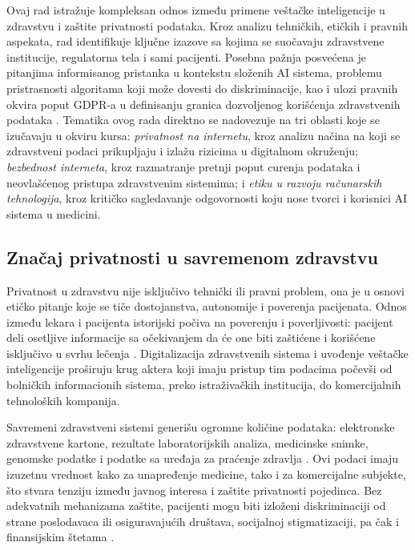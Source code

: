 \documentclass[12pt]{article}
\begin{document}
Ovaj rad istražuje kompleksan odnos između primene veštačke inteligencije u zdravstvu i zaštite privatnosti podataka. Kroz analizu tehničkih, etičkih i pravnih aspekata, rad identifikuje ključne izazove sa kojima se suočavaju zdravstvene institucije, regulatorna tela i sami pacijenti. Posebna pažnja posvećena je pitanjima informisanog pristanka u kontekstu složenih AI sistema, problemu pristrasnosti algoritama koji može dovesti do diskriminacije, kao i ulozi pravnih okvira poput GDPR-a u definisanju granica dozvoljenog korišćenja zdravstvenih podataka \cite{kumar2025}. Tematika ovog rada direktno se nadovezuje na tri oblasti koje se izučavaju u okviru kursa: \textit{privatnost na internetu}, kroz analizu načina na koji se zdravstveni podaci prikupljaju i izlažu rizicima u digitalnom okruženju; \textit{bezbednost interneta}, kroz razmatranje pretnji poput curenja podataka i neovlašćenog pristupa zdravstvenim sistemima; i \textit{etiku u razvoju računarskih tehnologija}, kroz kritičko 
sagledavanje odgovornosti koju nose tvorci i korisnici AI sistema u medicini.
 
\subsection{Značaj privatnosti u savremenom zdravstvu}
 
Privatnost u zdravstvu nije isključivo tehnički ili pravni problem, ona je u osnovi etičko pitanje koje se tiče dostojanstva, autonomije i poverenja pacijenata. Odnos između lekara i pacijenta istorijski počiva na poverenju i poverljivosti: pacijent deli osetljive informacije sa očekivanjem da će one biti zaštićene i korišćene isključivo u svrhu lečenja \cite{murdoch2021}. Digitalizacija zdravstvenih sistema i uvođenje veštačke inteligencije proširuju krug aktera koji imaju pristup tim podacima počevši od bolničkih informacionih sistema, preko istraživačkih institucija, do komercijalnih tehnoloških kompanija.
 
Savremeni zdravstveni sistemi generišu ogromne količine podataka: elektronske zdravstvene kartone, rezultate laboratorijskih analiza, medicinske snimke, genomske podatke i podatke sa uređaja za praćenje zdravlja \cite{abouelmehdi2017}. Ovi podaci imaju izuzetnu vrednost kako za unapređenje medicine, tako i za komercijalne subjekte, što stvara tenziju između javnog interesa i zaštite privatnosti pojedinca. Bez adekvatnih mehanizama zaštite, pacijenti mogu biti izloženi diskriminaciji od strane poslodavaca ili osiguravajućih društava, socijalnoj stigmatizaciji, pa čak i finansijskim štetama \cite{kumar2025}.
\newpage
\end{document}
